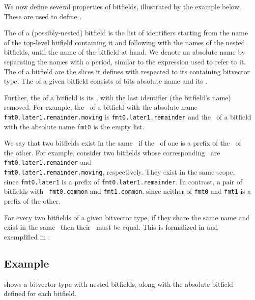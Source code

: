 We now define several properties of bitfields, illustrated by the example below.
These are used to define .

The \hypertarget{def-absolutename}{\absolutename} of a (possibly-nested) bitfield is the list of identifiers starting from the
name of the top-level bitfield containing it and following with the names of the nested bitfields,
until the name of the bitfield at hand. We denote an absolute name by separating the names with a
period, similar to the expression used to refer to it.
%
The \hypertarget{def-absoluteslice}{\absoluteslice} of a bitfield are the slices it defines with respected to its containing
bitvector type.
%
The \hypertarget{def-absolutebitfield}{\absolutebitfield} of a given bitfield consists of bits absolute name and its
\absoluteslices.

Further, the \hypertarget{def-bitfieldscope}{\bitfieldscope} of a bitfield is its \absolutename, with the last
identifier (the bitfield's name) removed.
For example, the \bitfieldscope\ of a bitfield with the absolute name \texttt{fmt0.later1.remainder.moving}
is \texttt{fmt0.later1.remainder} and the \bitfieldscope\ of a bitfield with the absolute name
\texttt{fmt0} is the empty list.

We say that two bitfields exist in the same \bitfieldscope\ if the \bitfieldscope\ of one is a prefix
of the \bitfieldscope\ of the other. For example, consider two bitfields whose corresponding \absolutenames\ are
\texttt{fmt0.later1.remainder} and \\
\texttt{fmt0.later1.remainder.moving}, respectively.
They exist in the same scope, since \texttt{fmt0.later1} is a prefix of
\texttt{fmt0.later1.remainder}.
In contrast, a pair of bitfields with \absolutenames\ \texttt{fmt0.common}
and \texttt{fmt1.common}, since neither of \texttt{fmt0} and \texttt{fmt1} is a prefix of the other.

For every two bitfields of a given bitvector type,
if they share the same name and exist in the same \bitfieldscope\ then their \absoluteslices\ must be
equal.
This is formalized in  and exemplified in .

\subsection{Example}
 shows a bitvector type with nested bitfields, along with the absolute bitfield
defined for each bitfield.

